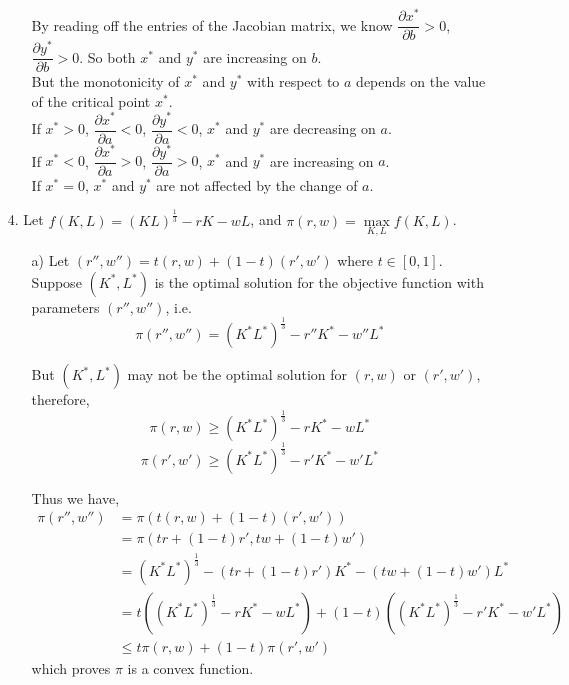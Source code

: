 \documentclass{article}
\begin{document}
\begin{enumerate}
\begin{enumerate}
        By reading off the entries of the Jacobian matrix, we know $\dfrac{\partial x^*}{\partial b}>0$, 
        $\dfrac{\partial y^*}{\partial b}>0$. So both $x^*$ and $y^*$ are increasing on $b$.\\
        
        But the monotonicity of $x^*$ and $y^*$ with respect to $a$ depends on the value
        of the critical point $x^*$. \\
        
        If $x^*>0$, $ \dfrac{\partial x^*}{\partial a}<0$, $\dfrac{\partial y^*}{\partial a}<0$, 
        $x^*$ and $y^*$ are decreasing on $a$.\\ 
        
        If $x^*<0$, $ \dfrac{\partial x^*}{\partial a}>0$, $\dfrac{\partial y^*}{\partial a}>0$, 
        $x^*$ and $y^*$ are increasing on $a$.\\ 
        
        If $x^*=0$, $x^*$ and $y^*$ are not affected by the change of $a$. \\
        
        \end{enumerate}
        
    \item[4. ] Let $f(K,L) = (KL)^{\frac{1}{3}} - rK - wL$, and $\pi(r,w)=\underset{K,L}{\max} f(K,L)$.
        \begin{enumerate}
            \item[a)] Let $(r'', w'') = t (r,w) + (1-t)(r',w')$ where $t \in [0,1]$.
            Suppose $(K^*,L^*)$ is the optimal solution for the objective function with parameters $(r'', w'')$, i.e.
                $$ \pi (r'', w'') = (K^* L^*)^{\frac{1}{3}} - r''K^* - w''L^* $$
            
            But $(K^*,L^*)$ may not be the optimal solution for $(r, w)$ or $(r', w')$, therefore,
                $$ \pi (r, w) \geq  (K^* L^*)^{\frac{1}{3}} - rK^* - wL^* $$
                $$ \pi (r', w') \geq  (K^* L^*)^{\frac{1}{3}} - r'K^* - w'L^* $$
            
            Thus we have, 
                \begin{align*}
                    \pi (r'', w'') &= \pi (t (r,w) + (1-t)(r',w')) \\
                                   &= \pi (tr+(1-t)r', tw+(1-t)w') \\
                                   &= (K^* L^*)^{\frac{1}{3}} - (tr+(1-t)r')K^* - (tw+(1-t)w')L^* \\
                                   &= t((K^* L^*)^{\frac{1}{3}} - rK^* - wL^*) + (1-t)((K^* L^*)^{\frac{1}{3}} - r'K^* - w'L^*) \\
                                   &\leq t\pi (r, w) + (1-t)\pi (r', w')
                \end{align*}
            which proves $\pi$ is a convex function. \\
            

\end{enumerate}
\end{enumerate}
\end{document}
